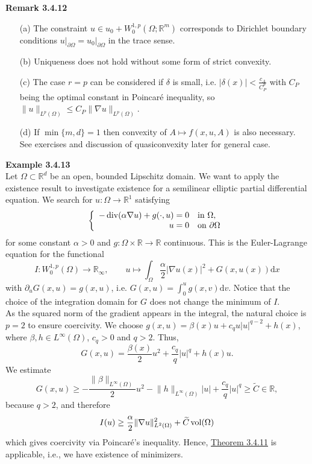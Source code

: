 \textbf{Remark 3.4.12}
\begin{itemize}
	\item[(a)] The constraint $u\in u_0+W_0^{1,p}(\Omega;\mathbb{R}^m)$ corresponds to Dirichlet boundary conditions $u\vert_{\partial\Omega}=u_0\vert_{\partial\Omega}$ in the trace sense.
	\item[(b)] Uniqueness does not hold without some form of strict convexity.
	\item[(c)] The case $r=p$ can be considered if $\delta$ is small, i.e. $\lvert\delta(x)\rvert<\frac{c_A}{C_P^p}$ with $C_P$ being the optimal constant in Poincar\'e inequality, so $\lVert u\rVert_{L^p(\Omega)}\leq C_P\lVert\nabla u\rVert_{L^p(\Omega)}$.
	\item[(d)] If $\min\{m,d\}=1$ then convexity of $A\longmapsto f(x,u,A)$ is also necessary. See exercises and discussion of quasiconvexity later for general case.\\[11pt]
\end{itemize}

\textbf{Example 3.4.13}\\
Let $\Omega\subset\mathbb{R}^d$ be an open, bounded Lipschitz domain. We want to apply the existence result to investigate existence for a semilinear elliptic partial differential equation. We search for $u:\Omega\longrightarrow\mathbb{R}^1$ satisfying
\[\left\{\begin{array}{rl}
	-\operatorname{div}\mathopen{}\left(\alpha\nabla u\right)\mathclose{}+g(\cdot,u)=0&\text{in }\Omega,\\
	u=0&\text{on }\partial\Omega
\end{array}\right.\]
for some constant $\alpha>0$ and $g:\Omega\times\mathbb{R}\longrightarrow\mathbb{R}$ continuous. This is the Euler-Lagrange equation for the functional
\[I:W_0^{1,p}(\Omega)\longrightarrow\mathbb{R}_\infty,\qquad u\longmapsto\int_\Omega{\frac{\alpha}{2}\lvert\nabla u(x)\rvert^2+G(x,u(x))\mathrm{d}x}\]
with $\partial_uG(x,u)=g(x,u)$, i.e. $G(x,u)=\int_0^u{g(x,v)\mathrm{d}v}$. Notice that the choice of the integration domain for $G$ does not change the minimum of $I$.\\

As the squared norm of the gradient appears in the integral, the natural choice is $p=2$ to ensure coercivity. We choose $g(x,u)=\beta(x)u+c_qu\lvert u\rvert^{q-2}+h(x)$, where $\beta,h\in L^\infty(\Omega)$, $c_q>0$ and $q>2$. Thus,
\[G(x,u)=\frac{\beta(x)}{2}u^2+\frac{c_q}{q}\lvert u\rvert^q+h(x)u.\]
We estimate
\[G(x,u)\geq-\frac{\lVert\beta\rVert_{L^\infty(\Omega)}}{2}u^2-\lVert h\rVert_{L^\infty(\Omega)}\lvert u\rvert+\frac{c_q}{q}\lvert u\rvert^q\geq\widetilde{C}\in\mathbb{R},\]
because $q>2$, and therefore
\[I(u)\geq\frac{\alpha}{2}\lVert\nabla u\rVert_{L^2(\Omega)}^2+\widetilde{C}\operatorname{vol}\mathopen{}\left(\Omega\right)\mathclose{}\]
which gives coercivity via Poincar\'e's inequality. Hence, \hyperlink{theorem_3_4_11}{Theorem 3.4.11} is applicable, i.e., we have existence of minimizers.\\

